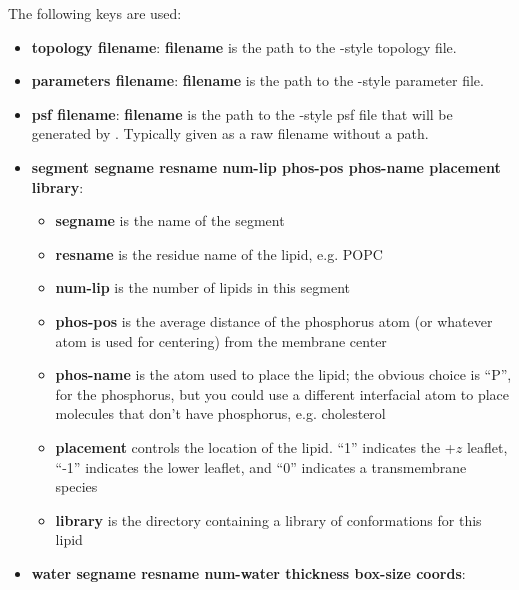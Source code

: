 \documentclass[12pt]{article}
\begin{document}
The following keys are used:

\begin{itemize}
    \item {\bf topology filename}: {\bf filename} is the path to the 
                                    \namd-style topology file.
    \item {\bf parameters filename}: {\bf filename} is the path to the 
                                    \namd-style parameter file. 
    \item {\bf psf filename}:  {\bf filename} is the path to the \namd-style 
                               psf file that will be generated by \omgwtf.  
                               Typically given as a raw filename without a
                               path. 
    \item {\bf segment segname resname num-lip phos-pos phos-name placement library}: 
          \begin{itemize}
             \item {\bf segname} is the name of the segment
             \item {\bf resname} is the residue name of the lipid, e.g. POPC
             \item {\bf num-lip} is the number of lipids in this segment
             \item {\bf phos-pos} is the average distance of the phosphorus
             atom (or whatever atom is used for centering) from the membrane center 
             \item {\bf phos-name} is the atom used to place the lipid; the
                 obvious choice is ``P'', for the phosphorus, but you
                 could use a different interfacial atom to place molecules
                 that don't have phosphorus, e.g. cholesterol
             \item {\bf placement} controls the location of the lipid. ``1''
             indicates the +$z$ leaflet, ``-1'' indicates the lower leaflet,
             and ``0'' indicates a transmembrane species
             \item {\bf library} is the directory containing a library of
             conformations for this lipid
          \end{itemize}
    \item {\bf water segname resname num-water thickness box-size coords}:

\end{itemize}
\end{document}
